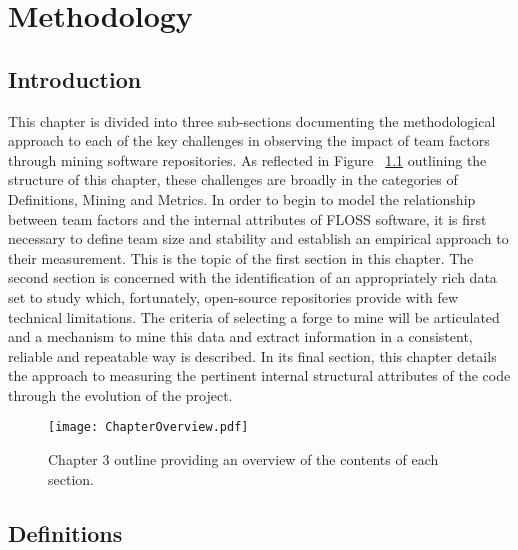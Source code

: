 
\graphicspath{{Chapter3/Figures/}{Chapter3/Tables/}{Chapter3/Charts/}}

\chapter{Methodology}

\section{Introduction} %

This chapter is divided into three sub-sections documenting the methodological approach to each of the key challenges in observing the impact of team factors through mining software repositories. As reflected in Figure ~\ref{fig:chapteroverview} outlining the structure of this chapter, these challenges are broadly in the categories of Definitions, Mining and Metrics. In order to begin to model the relationship between team factors and the internal attributes of FLOSS software, it is first necessary to define team size and stability and establish an empirical approach to their measurement. This is the topic of the first section in this chapter. The second section is concerned with the identification of an appropriately rich data set to study which, fortunately, open-source repositories provide with few technical limitations. The criteria of selecting a forge to mine will be articulated and a mechanism to mine this data and extract information in a consistent, reliable and repeatable way is described. In its final section, this chapter details the approach to measuring the pertinent internal structural attributes of the code through the evolution of the project. 
 
\begin{landscape}
\begin{figure}[htbp!] 
\centering    
\texttt{[image: ChapterOverview.pdf]}
\caption{Chapter 3 outline providing an overview of the contents of each section.}
\label{fig:chapteroverview}
\end{figure}
\end{landscape}

\section{Definitions} %
